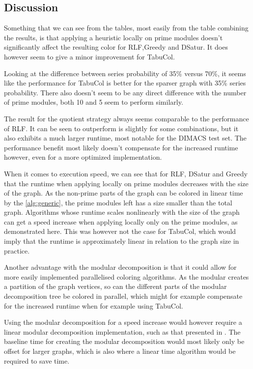 \documentclass[a4paper]{article}
\begin{document}
\FloatBarrier
\subsection{Discussion}

Something that we can see from the tables, most easily from the table combining
the results, is that applying a heuristic locally on prime modules doesn't
significantly affect the resulting color for RLF,Greedy and DSatur. It does
however seem to give a minor improvement for TabuCol. 

Looking at the difference between series probability of 35\% versus 70\%, it
seems like the performance for TabuCol is better for the sparser graph with
35\% series probability. There also doesn't seem to be any direct difference
with the number of prime modules, both 10 and 5 seem to perform similarly.

The result for the quotient strategy always seems comparable to the performance
of RLF. It can be seen to outperform is slightly for some combinations, but it
also exhibits a much larger runtime, most notable for the DIMACS test set. The
performance benefit most likely doesn't compensate for the increased runtime
however, even for a more optimized implementation.

When it comes to execution speed, we can see that for RLF, DSatur and Greedy that
the runtime when applying locally on prime modules decreases with the size of
the graph. As the non-prime parts of the graph can be colored in linear time
by the \autoref{alg:generic}, the prime modules left has a size smaller than
the total graph.  Algorithms whose runtime scales nonlinearly with the size of
the graph can get a speed increase when applying locally only on the
prime modules, as demonstrated here.  This was however not the case for
TabuCol, which would imply that the runtime is approximately linear in relation
to the graph size in practice.

Another advantage with the modular decomposition is that it could allow for
more easily implemented parallelised coloring algorithms. As the modular
creates a partition of the graph vertices, so can the different parts of the
modular decomposition tree be colored in parallel, which might for example
compensate for the increased runtime when for example using TabuCol.

Using the modular decomposition for a speed increase would however require a
linear modular decomposition implementation, such as that presented in
\cite{MDLinear}.  The baseline time for creating the modular decomposition would
most likely only be offset for larger graphs, which is also where a linear time
algorithm would be required to save time.
\end{document}
